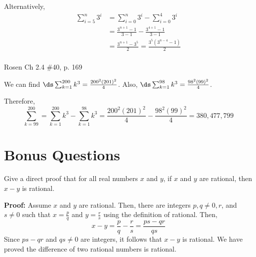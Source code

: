 \begin{questions}
\begin{solution}
    Alternatively, 
    \begin{align*}
        \sum_{i=5}^n 3^i &= \sum_{i=0}^n 3^i - \sum_{i=0}^4 3^i \tag{change index} \\
        &= \frac{3^{n+1} - 1}{3 - 1} - \frac{3^{4+1} - 1}{3 -1} \tag{Table 2}\\
        &= \frac{3^{n+1} - 3^{5}}{2} = \frac{3^5(3^{n-4} - 1)}{2} \tag{algebra} \\
    \end{align*}
\end{solution}




 Rosen Ch 2.4 \#40, p. 169
    \ifprintanswers
        \vspace{-10pt}
   \fi
\begin{solution}
 We can find $\ds \sum_{k=1}^{200} k^3 = \frac{200^2(201)^2}{4}$.
 Also, $\ds \sum_{k=1}^{98} k^3 = \frac{98^2(99)^2}{4}$.

 Therefore,
$$ \sum_{k=99}^{200} = \sum_{k=1}^{200} k^3 - \sum_{k=1}^{98} k^3
   = \frac{200^2(201)^2}{4} - \frac{98^2(99)^2}{4} 
   = 380,477,799 $$
\end{solution}




\section*{Bonus Questions} 


\bonusquestion[4] Give a direct proof that for all real numbers $x$ and $y$,
if $x$ and $y$ are rational, then $x-y$ is rational.
    \ifprintanswers
        \vspace{-10pt}
    \fi
\begin{solution} \textbf{Proof:} Assume $x$ and $y$ are rational. Then, there are
    integers $p, q\neq 0, r$, and $s\neq 0$ such that
    $x = \frac{p}{q}$ and $y = \frac{r}{s}$ using the definition of rational.  Then,
    \[ x - y = \frac{p}{q} - \frac{r}{s} = \frac{ps - qr}{qs} \]
    Since $ps - qr$ and $qs \neq 0$ are integers, it follows
    that $x - y$ is rational.  We have proved the difference of
    two rational numbers is rational.
\end{solution}




\end{questions}
